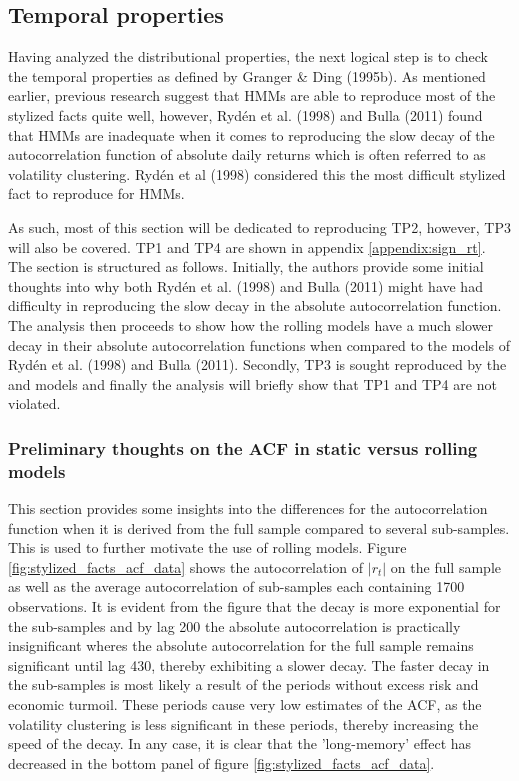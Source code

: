 \subsection{Temporal properties}
\label{Sec: Temporal properties}

Having analyzed the distributional properties, the next logical step is to check the temporal properties as defined by Granger \& Ding (1995b). As mentioned earlier, previous research suggest that HMMs are able to reproduce most of the stylized facts quite well, however, Rydén et al. (1998) and Bulla (2011) found that HMMs are inadequate when it comes to reproducing the slow decay of the autocorrelation function of absolute daily returns which is often referred to as volatility clustering. Rydén et al (1998) considered this the most difficult stylized fact to reproduce for HMMs.

As such, most of this section will be dedicated to reproducing TP2, however, TP3 will also be covered. TP1 and TP4 are shown in appendix \ref{appendix:sign_rt}. The section is structured as follows. Initially, the authors provide some initial thoughts into why both Rydén et al. (1998) and Bulla (2011) might have had difficulty in reproducing the slow decay in the absolute autocorrelation function. The analysis then proceeds to show how the rolling models have a much slower decay in their absolute autocorrelation functions when compared to the models of Rydén et al. (1998) and Bulla (2011). Secondly, TP3 is sought reproduced by the \mle and \jump models and finally the analysis will briefly show that TP1 and TP4 are not violated.

\subsubsection{Preliminary thoughts on the ACF in static versus rolling models}

This section provides some insights into the differences for the autocorrelation function when it is derived from the full sample compared to several sub-samples. This is used to further motivate the use of rolling models. Figure \ref{fig:stylized_facts_acf_data} shows the autocorrelation of $|r_t|$ on the full sample as well as the average autocorrelation of sub-samples each containing 1700 observations. It is evident from the figure that the decay is more exponential for the sub-samples and by lag 200 the absolute autocorrelation is practically insignificant wheres the absolute autocorrelation for the full sample remains significant until lag 430, thereby exhibiting a slower decay. The faster decay in the sub-samples is most likely a result of the periods without excess risk and economic turmoil. These periods cause very low estimates of the ACF, as the volatility clustering is less significant in these periods, thereby increasing the speed of the decay. In any case, it is clear that the 'long-memory' effect has decreased in the bottom panel of figure \ref{fig:stylized_facts_acf_data}.

